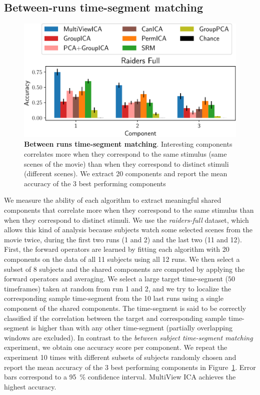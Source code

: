 \documentclass{report}
\begin{document}
{\subsection{Between-runs time-segment matching}
\label{app_spatialmaps}

\begin{figure}
  \centering
  \includegraphics[width=\textwidth]{figures/mvica/swetha_exp_full_fit.pdf}
  \caption{\textbf{Between runs time-segment matching}. Interesting components correlates more when they correspond to the same stimulus (same scenes of the movie) than when they correspond to distinct stimuli (different scenes).
  We extract 20 components and report the mean accuracy of the 3 best performing components}
  \label{fig:swetha}
\end{figure}

We measure the ability of each algorithm to extract meaningful shared components that correlate more when they correspond to the same stimulus than when they correspond to distinct stimuli. We use the \emph{raiders-full} dataset, which allows this kind of analysis because subjects watch some selected scenes from the movie twice, during the first two runs (1 and 2) and the last two (11 and 12).
%
First, the forward operators are learned by fitting each algorithm with 20 components on the data of all 11 subjects using all 12 runs. We then select a subset of 8 subjects and the shared components are computed by applying the forward operators and averaging.
%
We select a large target time-segment ($50$
timeframes) taken at random from run 1 and 2, and we try to localize the corresponding sample time-segment from the 10 last runs using a single component of the shared components.
%
The time-segment is said to be
correctly classified if the correlation between the target and corresponding sample
time-segment is higher than with any other time-segment (partially overlapping windows are excluded).
%
In contrast to the \emph{between subject time-segment matching} experiment, we obtain one accuracy score per component.
%
We repeat the experiment 10 times with different subsets of subjects randomly chosen and report the mean accuracy of the 3 best performing components in Figure~\ref{fig:swetha}. Error bars correspond to a 95~\% confidence interval.
%
MultiView ICA achieves the highest accuracy.

}
\end{document}
